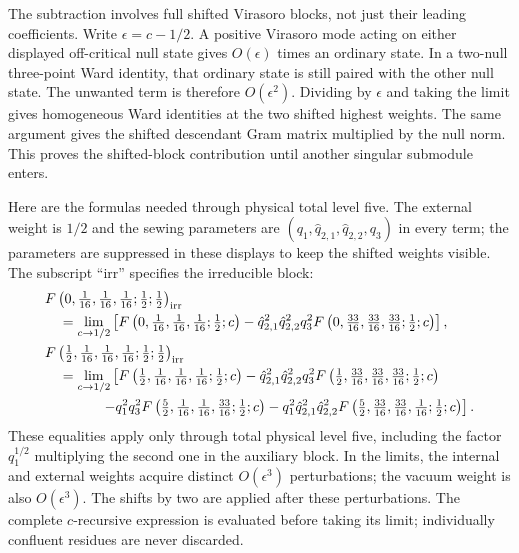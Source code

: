 The subtraction involves full shifted Virasoro blocks, not just their
leading coefficients.  Write $\epsilon=c-1/2$.  A positive Virasoro
mode acting on either displayed off-critical null state gives
$O(\epsilon)$ times an ordinary state.  In a two-null three-point Ward
identity, that ordinary state is still paired with the other null
state.  The unwanted term is therefore $O(\epsilon^2)$.  Dividing by
$\epsilon$ and taking the limit gives homogeneous Ward identities at
the two shifted highest weights.  The same argument gives the shifted
descendant Gram matrix multiplied by the null norm.  This proves the
shifted-block contribution until another singular submodule enters.

Here are the formulas needed through physical total level five.  The
external weight is $1/2$ and the sewing parameters are
$(q_1,\hat q_{2,1},\hat q_{2,2},q_3)$ in every term; the parameters
are suppressed in these displays to keep the shifted weights visible.
The subscript ``irr'' specifies the irreducible block:
\begin{align}
 &F\left(0,\tfrac1{16},\tfrac1{16},\tfrac1{16};\tfrac12;\tfrac12\right)_{\rm irr}
 \nonumber\\
 &\quad=\lim_{c\to1/2}\left[
 F\left(0,\tfrac1{16},\tfrac1{16},\tfrac1{16};\tfrac12;c\right)
 -\hat q_{2,1}^2\hat q_{2,2}^2q_3^2
 F\left(0,\tfrac{33}{16},\tfrac{33}{16},\tfrac{33}{16};\tfrac12;c\right)
 \right],\label{eq:ising-vacuum-first-cycle}\\
 &F\left(\tfrac12,\tfrac1{16},\tfrac1{16},\tfrac1{16};\tfrac12;\tfrac12\right)_{\rm irr}
 \nonumber\\
 &\quad=\lim_{c\to1/2}\left[
 F\left(\tfrac12,\tfrac1{16},\tfrac1{16},\tfrac1{16};\tfrac12;c\right)
 -\hat q_{2,1}^2\hat q_{2,2}^2q_3^2
 F\left(\tfrac12,\tfrac{33}{16},\tfrac{33}{16},\tfrac{33}{16};\tfrac12;c\right)
 \right.\nonumber\\
 &\qquad\qquad\left.
 -q_1^2q_3^2
 F\left(\tfrac52,\tfrac1{16},\tfrac1{16},\tfrac{33}{16};\tfrac12;c\right)
 -q_1^2\hat q_{2,1}^2\hat q_{2,2}^2
 F\left(\tfrac52,\tfrac{33}{16},\tfrac{33}{16},\tfrac1{16};\tfrac12;c\right)
 \right].\label{eq:ising-fermion-first-cycles}
\end{align}
These equalities apply only through total physical level five,
including the factor $q_1^{1/2}$ multiplying the second one in the
auxiliary block.  In the limits, the internal and external weights
acquire distinct $O(\epsilon^3)$ perturbations; the vacuum weight is
also $O(\epsilon^3)$.  The shifts by two are applied after these
perturbations.  The complete $c$-recursive expression is evaluated
before taking its limit; individually confluent residues are never
discarded.

